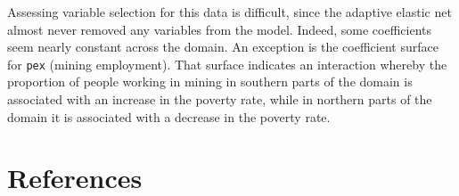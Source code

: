 \documentclass[authoryear, review, 11pt]{elsarticle}
\begin{document}
	Assessing variable selection for this data is difficult, since the adaptive elastic net almost never removed any variables from the model. Indeed, some coefficients seem nearly constant across the domain. An exception is the coefficient surface for \verb!pex! (mining employment). That surface indicates an interaction whereby the proportion of people working in mining in southern parts of the domain is associated with an increase in the poverty rate, while in northern parts of the domain it is associated with a decrease in the poverty rate.\\


\section{References}


\end{document}
